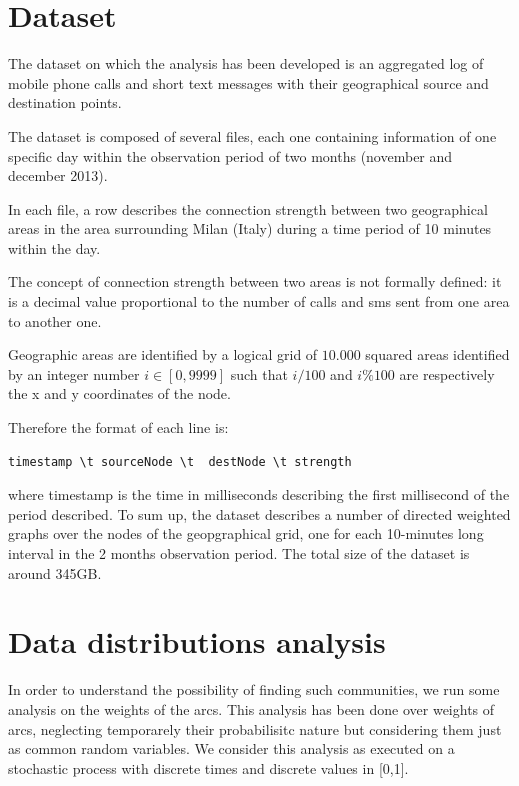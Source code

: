 \section{Dataset}
\label{thedataset}

The dataset on which the analysis has been developed is an aggregated log of mobile phone
calls and short text messages with their geographical source and destination points.

The dataset is composed of several files, each one containing information of one specific day
within the observation period of two months (november and december 2013).


In each file, a row describes the connection strength between two geographical areas in the area surrounding Milan (Italy) during a time period of 10 minutes within the day.

The concept of connection strength between two areas is not formally defined: it is a decimal value proportional to the number of calls and sms sent from one area to another one.

Geographic areas are identified by a logical grid of $10.000$ squared areas 
identified by an integer number $i \in [0, 9999]$ such that
$ i / 100 $ and $ i \% 100 $ are respectively the  
x and y coordinates of the node.

Therefore the format of each line is:

\begin{verbatim}
timestamp \t sourceNode	\t 	destNode \t strength
\end{verbatim}

where timestamp is the time in milliseconds describing the first millisecond of the period described.
To sum up, the dataset describes a number of directed weighted graphs over
the nodes of the geopgraphical grid, one for each 10-minutes long interval
in the 2 months observation period. The total size of the dataset is around 345GB.
\newpage

\section{Data distributions analysis}
\label{ds_analysis}

In order to understand the possibility of finding such communities, 
we run some analysis on the weights of the arcs.
This analysis has been done over weights of arcs, 
neglecting temporarely their probabilisitc nature but considering
them just as common random variables.
We consider this analysis as executed on a stochastic process with discrete times and discrete values in [0,1].


